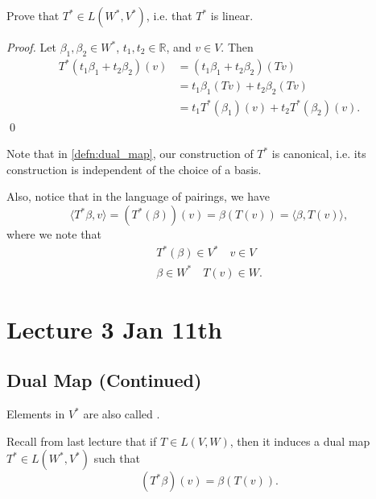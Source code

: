 \documentclass[notoc,notitlepage]{tufte-book}
\begin{document}
\begin{ex}
  Prove that $T^* \in L(W^*, V^*)$, i.e. that $T^*$ is linear.
\end{ex}

\begin{proof}
  Let $\beta_1, \beta_2 \in W^*$, $t_1, t_2 \in \mathbb{R}$, and $v \in V$.
  Then
  \begin{align*}
    T^*(t_1 \beta_1 + t_2 \beta_2)(v)
      &= (t_1 \beta_1 + t_2 \beta_2)(Tv) \\
      &= t_1 \beta_1 (Tv) + t_2 \beta_2 (Tv) \\
      &= t_1 T^*(\beta_1)(v) + t_2 T^*(\beta_2)(v).
  \end{align*}\qed\
\end{proof}

\begin{note}
  Note that in \cref{defn:dual_map}, our construction of $T^*$ is canonical,
  i.e. its construction is independent of the choice of a basis.

  Also, notice that in the language of pairings, we have
  \begin{equation*}
    \langle T^*\beta, v \rangle = (T^*(\beta))(v) = \beta(T(v)) = \langle \beta, T(v) \rangle,
  \end{equation*}
  where we note that
  \begin{gather*}
    T^*(\beta) \in V^* \quad v \in V \\
    \beta \in W^* \quad T(v) \in W.
  \end{gather*}
\end{note}



\chapter{Lecture 3 Jan 11th}%
\label{chp:lecture_3_jan_11th}

\section{Dual Map (Continued)}%
\label{sec:dual_map_continued}

\begin{note}
  Elements in $V^*$ are also called .
\end{note}

Recall from last lecture that if $T \in L(V, W)$, then it
induces a dual map $T^* \in L(W^*, V^*)$ such that
\begin{equation*}
  (T^* \beta)(v) = \beta (T(v)).
\end{equation*}
\end{document}
